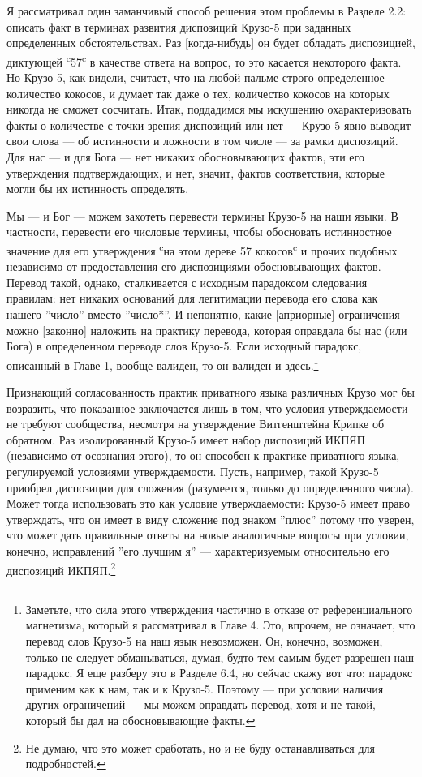 \documentclass[11pt]{book}
\begin{document}
Я рассматривал один заманчивый способ решения этом проблемы в Разделе 2.2: описать факт в терминах развития диспозиций Крузо-5 при заданных определенных обстоятельствах. Раз [когда-нибудь] он будет обладать диспозицией, диктующей \textsuperscript{c}57\textsuperscript{c} в качестве ответа на вопрос, то это касается некоторого факта. Но Крузо-5, как видели, считает, что на любой пальме строго определенное количество кокосов, и думает так даже о тех, количество кокосов на которых никогда не сможет сосчитать. Итак, поддадимся мы искушению охарактеризовать факты о количестве с точки зрения диспозиций или нет --- Крузо-5 явно выводит свои слова --- об истинности и ложности в том числе --- за рамки диспозиций. Для нас --- и для Бога --- нет никаких обосновывающих фактов, эти его утверждения подтверждающих, и нет, значит, фактов соответствия, которые могли бы их истинность определять.

Мы --- и Бог --- можем захотеть перевести термины Крузо-5 на наши языки. В частности, перевести его числовые термины, чтобы обосновать истинностное значение для его утверждения \textsuperscript{c}на этом дереве 57 кокосов\textsuperscript{c} и прочих подобных независимо от предоставления его диспозициями обосновывающих фактов. Перевод такой, однако, сталкивается с исходным парадоксом следования правилам: нет никаких оснований для легитимации перевода его слова как нашего ''число'' вместо ''число*''. И непонятно, какие [априорные] ограничения можно [законно] наложить на практику перевода, которая оправдала бы нас (или Бога) в определенном переводе слов Крузо-5. Если исходный парадокс, описанный в Главе 1, вообще валиден, то он валиден и здесь.\footnote{Заметьте, что сила этого утверждения частично в отказе от референциального магнетизма, который я рассматривал в Главе 4. Это, впрочем, не означает, что перевод слов Крузо-5 на наш язык невозможен. Он, конечно, возможен, только не следует обманываться, думая, будто тем самым будет разрешен наш парадокс. Я еще разберу это в Разделе 6.4, но сейчас скажу вот что: парадокс применим как к нам, так и к Крузо-5. Поэтому --- при условии наличия других ограничений --- мы можем оправдать перевод, хотя и не такой, который бы дал на обосновывающие факты.}

Признающий согласованность практик приватного языка различных Крузо мог бы возразить, что показанное заключается лишь в том, что условия утверждаемости не требуют сообщества, несмотря на утверждение Витгенштейна Крипке об обратном. Раз изолированный Крузо-5 имеет набор диспозиций ИКПЯП (независимо от осознания этого), то он способен к практике приватного языка, регулируемой условиями утверждаемости. Пусть, например, такой Крузо-5 приобрел диспозиции для сложения (разумеется, только до определенного числа). Может тогда использовать это как условие утверждаемости: Крузо-5 имеет право утверждать, что он имеет в виду сложение под знаком ''плюс'' потому что уверен, что может дать правильные ответы на новые аналогичные вопросы при условии, конечно, исправлений ''его лучшим я'' --- характеризуемым относительно его диспозиций ИКПЯП.\footnote{Не думаю, что это может сработать, но и не буду останавливаться для подробностей.}
\end{document}
